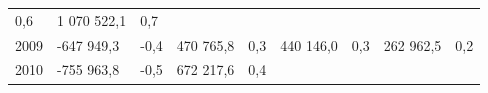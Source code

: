 \begin{longtable}[]{@{}lllllllll@{}}
\begin{minipage}[t]{0.06\columnwidth}
0,6\strut
\end{minipage} & \begin{minipage}[t]{0.10\columnwidth}\raggedright
1 070 522,1\strut
\end{minipage} & \begin{minipage}[t]{0.06\columnwidth}\raggedright
0,7\strut
\end{minipage}\tabularnewline
\begin{minipage}[t]{0.05\columnwidth}\raggedright
2009\strut
\end{minipage} & \begin{minipage}[t]{0.10\columnwidth}\raggedright
-647 949,3\strut
\end{minipage} & \begin{minipage}[t]{0.06\columnwidth}\raggedright
-0,4\strut
\end{minipage} & \begin{minipage}[t]{0.16\columnwidth}\raggedright
470 765,8\strut
\end{minipage} & \begin{minipage}[t]{0.06\columnwidth}\raggedright
0,3\strut
\end{minipage} & \begin{minipage}[t]{0.12\columnwidth}\raggedright
440 146,0\strut
\end{minipage} & \begin{minipage}[t]{0.06\columnwidth}\raggedright
0,3\strut
\end{minipage} & \begin{minipage}[t]{0.10\columnwidth}\raggedright
262 962,5\strut
\end{minipage} & \begin{minipage}[t]{0.06\columnwidth}\raggedright
0,2\strut
\end{minipage}\tabularnewline
\begin{minipage}[t]{0.05\columnwidth}\raggedright
2010\strut
\end{minipage} & \begin{minipage}[t]{0.10\columnwidth}\raggedright
-755 963,8\strut
\end{minipage} & \begin{minipage}[t]{0.06\columnwidth}\raggedright
-0,5\strut
\end{minipage} & \begin{minipage}[t]{0.16\columnwidth}\raggedright
672 217,6\strut
\end{minipage} & \begin{minipage}[t]{0.06\columnwidth}\raggedright
0,4\strut
\end{minipage} & \begin{minipage}[t]{0.12\columnwidth}\raggedright

\end{minipage}
\end{longtable}
